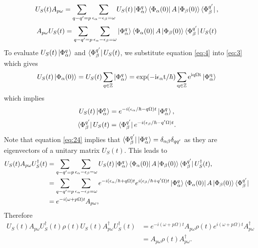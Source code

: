 \documentclass[10pt]{article}
\numberwithin{equation}{section}
\begin{document}
\begin{equation}
U_{S}(t)A_{p\omega} = \sum_{q-q' = p} \sum_{\epsilon_{\alpha}-\epsilon_{\beta} = \omega}  U_{S}(t)\ket{\Phi_{\alpha}^{q}}\bra{\Phi_{\alpha}(0)}A\ket{\Phi_{\beta}(0)}\bra{\Phi_{\beta}^{q'}},
\end{equation}
\begin{equation}
A_{p\omega}U_{S}(t)= \sum_{q-q' = p} \sum_{\epsilon_{\alpha}-\epsilon_{\beta} = \omega}  \ket{\Phi_{\alpha}^{q}}\bra{\Phi_{\alpha}(0)}A\ket{\Phi_{\beta}(0)}\bra{\Phi_{\beta}^{q'}}U_{S}(t)
\end{equation}
To evaluate $U_{S}(t)\ket{\Phi_{\alpha}^{q}}$ and $\bra{\Phi_{\beta}^{q'}}U_{S}(t)$, we substitute equation \ref{eq:4} into \ref{eq:3} which gives
\begin{equation}
U_{S}(t)\ket{\Phi_{\alpha}(0)} =  U_{S}(t)\sum_{q \in\mathbb{Z}}  \ket{\Phi_{\alpha}^{q}} =  \rm exp(-i\epsilon_{\alpha}t/\hbar) \sum_{q \in\mathbb{Z}}\rm  e^{iq\Omega t}  \ket{\Phi_{\alpha}^{q}}   
\end{equation}
which implies 
\begin{equation} \label{eq:24}
U_{S}(t)\ket{\Phi_{\alpha}^{q}} =  e^{-i(\epsilon_{\alpha}/\hbar-q\Omega)t} \ket{\Phi_{\alpha}^{q}}, 
\end{equation}
\begin{equation}
\bra{\Phi_{\beta}^{q'}}U_{S}(t)= \bra{\Phi_{\beta}^{q'}} e^{-i(\epsilon_{\beta}/\hbar-q'\Omega)t}.
\end{equation}
Note that equation \ref{eq:24} implies that $\bra{\Phi_{\beta}^{q'}}\ket{\Phi_{\alpha}^{q}} = \delta_{\alpha\beta}\delta_{qq'}$ as they are eigenvectors of a unitary matrix $U_{S}(t)$. This leads to
\begin{align}
U_{S}(t)A_{p\omega}U_{S}^{\dagger}(t) &= \sum_{q-q' = p} \sum_{\epsilon_{\alpha}-\epsilon_{\beta} = \omega}  U_{S}(t)\ket{\Phi_{\alpha}^{q}}\bra{\Phi_{\alpha}(0)}A\ket{\Phi_{\beta}(0)}\bra{\Phi_{\beta}^{q'}}U_{S}^{\dagger}(t), \\
&= \sum_{q-q' = p} \sum_{\epsilon_{\alpha}-\epsilon_{\beta} = \omega} e^{-i(\epsilon_{\alpha}/\hbar+q\Omega)t}e^{i(\epsilon_{\beta}/\hbar+q'\Omega)t}  \ket{\Phi_{\alpha}^{q}}\bra{\Phi_{\alpha}(0)}A\ket{\Phi_{\beta}(0)}\bra{\Phi_{\beta}^{q'}} \\
&=e^{-i(\omega+p\Omega)t} A_{p\omega},
\end{align}
Therefore
\begin{align}
U_{S}(t)A_{p\omega}U^{\dagger}_{S}(t)\rho(t)U_{S}(t)A_{p\omega}^{\dagger}U^{\dagger}_{S}(t) &= e^{-i(\omega+p\Omega)t} A_{p\omega}\rho(t)e^{i(\omega+p\Omega)t} A^{\dagger}_{p\omega} \\
&= A_{p\omega}\rho(t)A^{\dagger}_{p\omega}.
\end{align}
\end{document}
